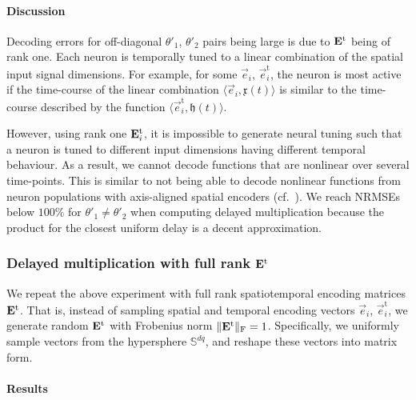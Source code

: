\paragraph{Discussion}
Decoding errors for off-diagonal $\theta'_1$, $\theta'_2$ pairs being large is due to $\mathbf{E}^\mathrm{t}$ being of rank one.
Each neuron is temporally tuned to a linear combination of the spatial input signal dimensions.
For example, for some $\vec e_i$, $\vec e_i^\mathrm{t}$, the neuron is most active if the time-course of the linear combination $\langle \vec e_i, \mathfrak{x}(t) \rangle$ is similar to the time-course described by the function $\langle \vec e_i^\mathrm{t}, \mathfrak{h}(t) \rangle$.

However, using rank one $\mathbf{E}_i^\mathrm{t}$, it is impossible to generate neural tuning such that a neuron is tuned to different input dimensions having different temporal behaviour.
As a result, we cannot decode functions that are nonlinear over several time-points.
This is similar to not being able to decode nonlinear functions from neuron populations with axis-aligned spatial encoders (cf.~).
We reach NRMSEs below $100\%$ for $\theta'_1 \neq \theta'_2$ when computing delayed multiplication because the product for the closest uniform delay is a decent approximation.


\subsubsection{Delayed multiplication with full rank $\mathbf{E}^\mathrm{t}$}

We repeat the above experiment with full rank spatiotemporal encoding matrices $\mathbf{E}^\mathrm{t}$.
That is, instead of sampling spatial and temporal encoding vectors $\vec e_i$, $\vec e^\mathrm{t}_i$, we generate random $\mathbf{E}^\mathrm{t}$ with Frobenius norm $\| \mathbf{E}^\mathrm{t} \|_\mathrm{F} = 1$.
Specifically, we uniformly sample vectors from the hypersphere $\mathbb{S}^{dq}$, and reshape these vectors into matrix form.

\paragraph{Results}

